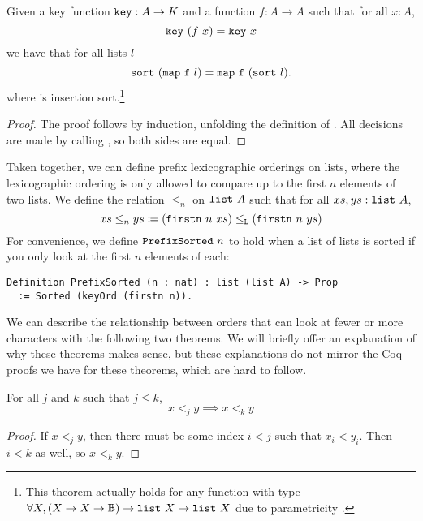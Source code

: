 \documentclass[sigplan,10pt,anonymous,review]{thesis}
\begin{document}
\begin{theorem}
  Given a key function $\texttt{\textup{key}} : A \to K$ and a function $f : A \to A$
  such that for all $x : A$,
  \begin{equation*}
    \texttt{\textup{key}}~(f~x) = \texttt{\textup{key}}~x
  \end{equation*}
  we have that for all lists $l$
  \begin{equation*}
    \texttt{\textup{sort}}~(\texttt{\textup{map}}~\texttt{\textup{f}}~l) = \texttt{\textup{map}}~\texttt{\textup{f}}~(\texttt{\textup{sort}}~l).
  \end{equation*}
  where  is insertion sort.\footnote{This theorem actually
    holds for any function with type $\forall X, (X \to X \to \mathbb{B}) \to
    \texttt{\textup{list}}~X \to \texttt{\textup{list}}~X$ due to parametricity \cite{free}.}
\end{theorem}
\begin{proof}
  The proof follows by induction, unfolding the definition of
  . All decisions are made by calling , so both
  sides are equal.
\end{proof}

Taken together, we can define prefix lexicographic orderings on lists,
where the lexicographic ordering is only allowed to compare up to the
first $n$ elements of two lists. We define the relation $\le_n$ on
$\texttt{\textup{list}}~A$ such that for all $xs, ys : \texttt{\textup{list}}~A$,
\begin{equation*}
  xs \le_n ys \coloneqq (\texttt{\textup{firstn}}~n~xs) \le_{\texttt{\textup{L}}} (\texttt{\textup{firstn}}~n~ys)
\end{equation*}
For convenience, we define $\texttt{\textup{PrefixSorted}}~n$ to hold when a list
of lists is sorted if you only look at the first $n$ elements of each:
\begin{lstlisting}
Definition PrefixSorted (n : nat) : list (list A) -> Prop
  := Sorted (keyOrd (firstn n)).
\end{lstlisting}

We can describe the relationship between orders that can look at fewer
or more characters with the following two theorems. We will briefly
offer an explanation of why these theorems makes sense, but these
explanations do not mirror the Coq proofs we have for these theorems,
which are hard to follow.

\begin{theorem}
  For all $j$ and $k$ such that $j \le k$,
  \begin{equation*}
    x <_j y \implies x <_k y
  \end{equation*}
\end{theorem}
\begin{proof}
  If $x <_j y$, then there must be some index $i < j$ such that $x_i <
  y_i$. Then $i < k$ as well, so $x <_k y$.
\end{proof}
\end{document}
